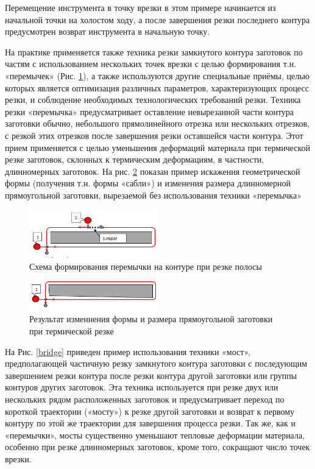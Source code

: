 \documentclass[12pt]{report}
\begin{document}
Перемещение инструмента в точку врезки
в этом примере начинается из начальной точки на холостом ходу,
а после завершения резки последнего контура
предусмотрен возврат инструмента в начальную точку.

На практике применяется также техника резки
замкнутого контура заготовок по частям
с использованием нескольких точек врезки
с целью формирования т.н. «перемычек»
(Рис. \ref{jumper}),
а также используются другие специальные приёмы,
целью которых является оптимизация различных параметров,
характеризующих процесс резки,
и соблюдение необходимых технологических требований резки.
Техника резки «перемычка» предусматривает
оставление невырезанной части контура заготовки обычно,
небольшого прямолинейного отрезка или нескольких отрезков,
с резкой этих отрезков после завершения резки оставшейся части контура.
Этот прием применяется с целью уменьшения деформаций материала
при термической резке заготовок, склонных к термическим деформациям,
в частности, длинномерных заготовок.
На рис. \ref{saber} показан пример искажения геометрической формы
(получения т.н. формы «сабли»)
и изменения размера длинномерной прямоугольной заготовки,
вырезаемой без использования техники «перемычка»

\begin{figure}
  \begin{center}
  \includegraphics[width=0.5\textwidth]{jumper.png}
  \caption{Схема формирования перемычки на контуре при резке полосы}
  \label{jumper}
  \end{center}
\end{figure}

\begin{figure}
  \begin{center}
  \includegraphics[width=0.5\textwidth]{saber.png}
  \caption{Результат изменнения формы и размера прямоугольной заготовки при термической резке}
  \label{saber}
  \end{center}
\end{figure}

На Рис. \ref{bridge}
приведен пример использования техники «мост»,
предполагающей  частичную резку замкнутого контура
заготовки с последующим завершением резки контура
после резки контура другой заготовки или
группы контуров других заготовок.
Эта техника используется при резке двух или
нескольких рядом расположенных заготовок и
предусматривает переход по короткой траектории («мосту»)
к резке другой заготовки и возврат к первому контуру
по этой же траектории для завершения процесса резки.
Так же, как и «перемычки»,
мосты существенно уменьшают тепловые деформации материала,
особенно при резке длинномерных заготовок,
кроме того, сокращают число точек врезки.
\end{document}
